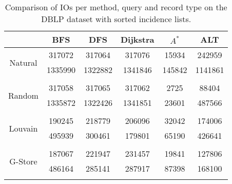 \begin{table}
	\begin{center}
		 \begin{tabular}[c]{c c c c c c} \toprule
			  & BFS & DFS & Dijkstra & $A^*$  & ALT \\ \midrule 
 			\multirow{2}{*}{Natural}  & 317072 & 317064 & 317076 & 15934 & 242959 \\ 
 				 & 1335990 & 1322882 & 1341846 & 145842 & 1141861 \\ 
 				&&&&& \\[-0.5em]
 			\multirow{2}{*}{Random}  & 317058 & 317065 & 317062 & 2725 & 88404 \\ 
 				 & 1335872 & 1322426 & 1341851 & 23601 & 487566 \\ 
 				&&&&& \\[-0.5em]
 			\multirow{2}{*}{Louvain}  & 190245 & 218779 & 206096 & 32042 & 174006 \\ 
 				 & 495939 & 300461 & 179801 & 65190 & 426641 \\ 
 				&&&&& \\[-0.5em]
 			\multirow{2}{*}{G-Store}  & 187067 & 221947 & 231457 & 19841 & 127806 \\ 
 				 & 486164 & 285141 & 287917 & 87398 & 168100 \\ 
 				&&&&& \\[-0.5em]
 					\end{tabular}  
  	 \end{center}
	 \caption{Comparison of IOs per method, query and record type on the DBLP dataset with sorted incidence lists.}
	 \label{dblp-s}
\end{table}
